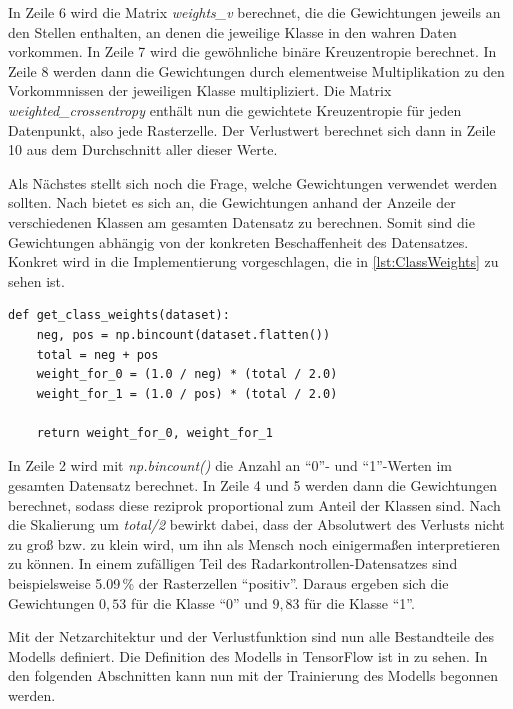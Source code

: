 In Zeile 6 wird die Matrix \emph{weights\_v} berechnet, die die Gewichtungen jeweils an den Stellen enthalten, an denen die jeweilige Klasse in den wahren Daten vorkommen.
In Zeile 7 wird die gewöhnliche binäre Kreuzentropie berechnet.
In Zeile 8 werden dann die Gewichtungen durch elementweise Multiplikation zu den Vorkommnissen der jeweiligen Klasse multipliziert.
Die Matrix \emph{weighted\_crossentropy} enthält nun die gewichtete Kreuzentropie für jeden Datenpunkt, also jede Rasterzelle.
Der Verlustwert berechnet sich dann in Zeile 10 aus dem Durchschnitt aller dieser Werte.

Als Nächstes stellt sich noch die Frage, welche Gewichtungen verwendet werden sollten.
Nach \cite{KerasImbalancedData} bietet es sich an, die Gewichtungen anhand der Anzeile der verschiedenen Klassen am gesamten Datensatz zu berechnen.
Somit sind die Gewichtungen abhängig von der konkreten Beschaffenheit des Datensatzes.
Konkret wird in \cite{KerasImbalancedData} die Implementierung vorgeschlagen, die in \autoref{lst:ClassWeights} zu sehen ist.

\begin{code}
\begin{verbatim}
def get_class_weights(dataset):
    neg, pos = np.bincount(dataset.flatten())
    total = neg + pos
    weight_for_0 = (1.0 / neg) * (total / 2.0)
    weight_for_1 = (1.0 / pos) * (total / 2.0)

    return weight_for_0, weight_for_1
\end{verbatim}
\label{lst:ClassWeights}
\end{code}

In Zeile 2 wird mit \emph{np.bincount()} die Anzahl an "`0"'- und "`1"'-Werten im gesamten Datensatz berechnet.
In Zeile 4 und 5 werden dann die Gewichtungen berechnet, sodass diese reziprok proportional zum Anteil der Klassen sind.
Nach die Skalierung um \emph{total/2} bewirkt dabei, dass der Absolutwert des Verlusts nicht zu groß bzw. zu klein wird, um ihn als Mensch noch einigermaßen interpretieren zu können.
In einem zufälligen Teil des Radarkontrollen-Datensatzes sind beispielsweise 5.09\,\% der Rasterzellen "`positiv"'.
Daraus ergeben sich die Gewichtungen $0,53$ für die Klasse "`0"' und $9,83$ für die Klasse "`1"'.

Mit der Netzarchitektur und der Verlustfunktion sind nun alle Bestandteile des Modells definiert.
Die Definition des Modells in TensorFlow ist in  zu sehen.
In den folgenden Abschnitten kann nun mit der Trainierung des Modells begonnen werden.
